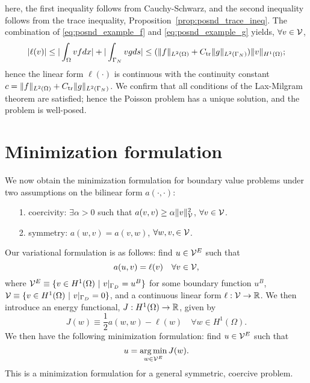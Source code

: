 here, the first inequality follows from Cauchy-Schwarz, and the second inequality follows from the trace inequality, Proposition~\ref{prop:posnd_trace_ineq}. The combination of \eqref{eq:posnd_example_f} and \eqref{eq:posnd_example_g} yields, $\forall v \in \mathcal{V}$,
\begin{equation*}
  | \ell(v) | \leq | \int_\Omega vf dx | + |\int_{\Gamma_N} vg ds|
  \leq  (\| f \|_{L^2(\Omega)} + C_{\rm tr} \| g \|_{L^2(\Gamma_N)}) \| v \|_{H^1(\Omega)};
\end{equation*}
hence the linear form $\ell(\cdot)$ is continuous with the continuity constant $c =  \| f \|_{L^2(\Omega)} + C_{\rm tr} \| g \|_{L^2(\Gamma_N)}$.  We confirm that all conditions of the Lax-Milgram theorem are satisfied; hence the Poisson problem has a unique solution, and the problem is well-posed.

\section{Minimization formulation}
We now obtain the minimization formulation for boundary value problems under two assumptions on the bilinear form $a(\cdot,\cdot)$:
\begin{itemize}
\item[1.] coercivity: $\exists \alpha > 0$ such that $a(v,v) \geq \alpha\| v \|^2_{\mathcal{V}}$, $\forall v \in \mathcal{V}$.
\item[2.] symmetry: $a(w,v) = a(v,w)$, $\forall w,v, \in \mathcal{V}$.
\end{itemize}
Our variational formulation is as follows: find $u \in \mathcal{V}^E$ such that
\begin{equation}
  a(u,v) = \ell(v) \quad \forall v \in \mathcal{V},
  \label{eq:posnd_energy_var}
\end{equation}
where $\calV^E \equiv  \{ v \in H^1(\Omega) \ | \ v|_{\Gamma_D} = u^B\}$ for some boundary function $u^B$, $ \calV \equiv \{ v \in H^1(\Omega) \ | \ v|_{\Gamma_D} = 0 \}$, and a continuous linear form $\ell: \mathcal{V} \to \mathbb{R}$.
  We then introduce an energy functional, $J: H^1(\Omega) \to \mathbb{R}$, given by
\begin{equation}
  J(w) \equiv \frac{1}{2} a(w,w) - \ell(w) \quad \forall w \in H^1(\Omega).
  \label{eq:posnd_energy_fun}
\end{equation}
 We then have the following minimization formulation: find $u \in \mathcal{V}^E$ such that
\begin{equation}
  u = \operatorname*{arg\,min}_{w \in \mathcal{V}^E} J(w).
  \label{eq:posnd_energy_min}
\end{equation}
This is a minimization formulation for a general symmetric, coercive problem.

